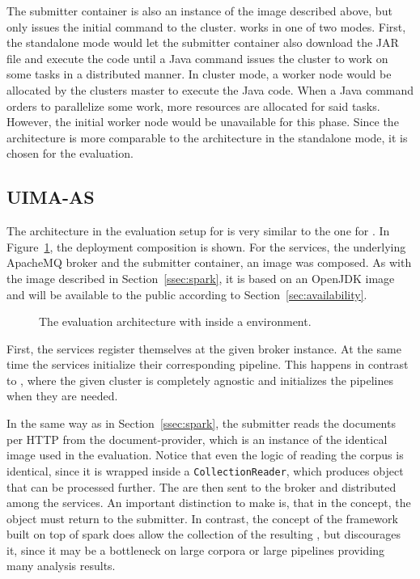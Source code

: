 The submitter container is also an instance of the \spark{} image described above, but only issues the initial command to the cluster. \spark{} works in one of two modes. First, the standalone mode would let the submitter container also download the JAR file and execute the code until a Java command issues the cluster to work on some tasks in a distributed manner. In cluster mode, a worker node would be allocated by the clusters master to execute the Java code. When a Java command orders \spark{} to parallelize some work, more resources are allocated for said tasks. However, the initial worker node would be unavailable for this phase. Since the architecture is more comparable to the \uimaas{} architecture in the standalone mode, it is chosen for the evaluation.
\subsection{UIMA-AS}
The \docker{} architecture in the evaluation setup for \uimaas{} is very similar to the one for \spark{}. In Figure~\ref{fig:arch-uimaas}, the deployment composition is shown. For the \uimaas{} services, the underlying ApacheMQ broker and the submitter container, an \uimaas{} \docker{} image was composed. As with the \spark{} image described in Section~\ref{ssec:spark}, it is based on an OpenJDK image and will be available to the public according to Section~\ref{sec:availability}.
\begin{figure}[htb]
	\centering
	
	\caption[The evaluation architecture with UIMA-AS inside a Docker environment.]{The evaluation architecture with \uimaas{} inside a \docker{} environment.}
	\label{fig:arch-uimaas}
\end{figure}
First, the \uimaas{} services register themselves at the given broker instance. At the same time the services initialize their corresponding pipeline. This happens in contrast to \spark{}, where the given cluster is completely \uima{} agnostic and initializes the pipelines when they are needed.

In the same way as in Section~\ref{ssec:spark}, the submitter reads the documents per HTTP from the document-provider, which is an instance of the identical image used in the \spark{} evaluation. Notice that even the logic of reading the corpus is identical, since it is wrapped inside a \lstinline|CollectionReader|, which produces \cas{} object that can be processed further. The \cas{} are then sent to the broker and distributed among the services. An important distinction to make is, that in the \uimaas{} concept, the \cas{} object must return to the submitter. In contrast, the concept of the framework built on top of spark does allow the collection of the resulting \cas{}, but discourages it, since it may be a bottleneck on large corpora or large pipelines providing many analysis results.


